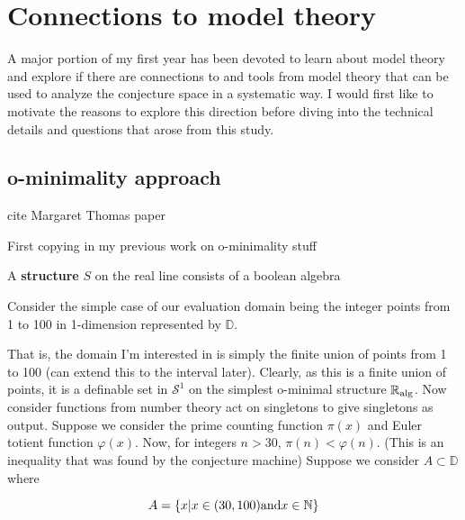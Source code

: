 \section{Connections to model theory}
A major portion of my first year has been devoted to learn about model theory and explore if there are connections to and tools from model theory that can be used to analyze the conjecture space in a systematic way. I would first like to motivate the reasons to explore this direction before diving into the technical details and questions that arose from this study.

% 
\subsection{o-minimality approach}

cite Margaret Thomas paper \cite{thomasConvergenceResultsFunction2012}

First copying in my previous work on o-minimality stuff

\begin{definition}[Structure]
    A \textbf{structure} $S$ on the real line consists of a boolean algebra
\end{definition}

Consider the simple case of our evaluation domain being the integer points from 1 to 100 in 1-dimension represented by $\mathbb{D}$.

That is, the domain I'm interested in is simply the finite union of points from 1 to 100 (can extend this to the interval later). Clearly, as this is a finite union of points, it is a definable set in $\mathcal{S}^1$ on the simplest o-minimal structure $\mathbb{R}_{\text{alg}}$.
Now consider functions from number theory act on singletons to give singletons as output. Suppose we consider the prime counting function $\pi(x)$ and Euler totient function $\varphi(x)$. Now, for integers $n > 30$, $\pi(n) < \varphi(n)$. (This is an inequality that was found by the conjecture machine)
Suppose we consider $A\subset\mathbb{D}$ where

\begin{equation*}
    A = \{x | x\in (30, 100) \text{and} x\in\mathbb{N} \}
\end{equation*}

